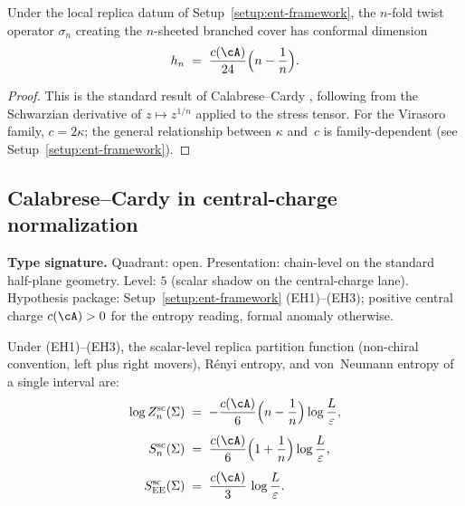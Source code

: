 \begin{lemma}
\label{lem:ent-twist-dimension}
Under the local replica datum of Setup~\textup{\ref{setup:ent-framework}},
the $n$-fold twist operator $\sigma_n$ creating the $n$-sheeted
branched cover has conformal dimension
\begin{equation}\label{eq:ent-twist-dim}
h_n
\;=\;
\frac{c(\cA)}{24}\Bigl(n - \frac{1}{n}\Bigr).
\end{equation}
\end{lemma}

\begin{proof}
This is the standard result of Calabrese--Cardy
\cite[Eq.~(2.5)]{Calabrese-Cardy04},
following from the Schwarzian derivative of
$z \mapsto z^{1/n}$ applied to the stress tensor.
For the Virasoro family, $c = 2\kappa$; the
general relationship between $\kappa$ and~$c$ is family-dependent
(see Setup~\ref{setup:ent-framework}).
\end{proof}

\subsection{Calabrese--Cardy in central-charge normalization}

\begin{theorem}
\label{thm:ent-scalar-entropy}
\textbf{Type signature.}  Quadrant: open.  Presentation: chain-level
on the standard half-plane geometry.  Level: $5$ (scalar shadow on
the central-charge lane).  Hypothesis package:
Setup~\textup{\ref{setup:ent-framework}} (EH1)--(EH3); positive
central charge $c(\cA)>0$ for the entropy reading, formal anomaly
otherwise.

Under (EH1)--(EH3), the scalar-level replica partition function
(non-chiral convention, left plus right movers), R\'enyi entropy, and
von~Neumann entropy of a single interval are:
\begin{align}
\log Z_n^{\mathrm{sc}}(\Sigma)
&\;=\;
-\frac{c(\cA)}{6}\Bigl(n - \frac{1}{n}\Bigr)
\log\frac{L}{\varepsilon},
\label{eq:ent-replica-partition}
\\[4pt]
S_n^{\mathrm{sc}}(\Sigma)
&\;=\;
\frac{c(\cA)}{6}\Bigl(1 + \frac{1}{n}\Bigr)
\log\frac{L}{\varepsilon},
\label{eq:ent-renyi-scalar}
\\[4pt]
S_{\EE}^{\mathrm{sc}}(\Sigma)
&\;=\;
\frac{c(\cA)}{3}\,\log\frac{L}{\varepsilon}.
\label{eq:ent-vn-scalar}
\end{align}
\end{theorem}


